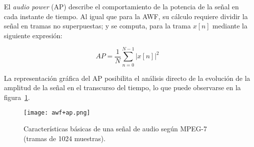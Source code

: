 El \textit{audio power} (AP) describe el comportamiento de la potencia de la señal en cada instante de tiempo.
Al igual que para la AWF, su cálculo requiere dividir la señal en tramas no superpuestas;
y se computa, para la trama $x[n]$ mediante la siguiente expresión:

\begin{equation}
    \label{eq:AP}
    AP = \frac{1}{N}\sum_{n=0}^{N-1}{|x[n]|^2}
\end{equation}

La representación gráfica del AP posibilita el análisis directo de la evolución de la amplitud de la señal en el transcurso del tiempo, lo que puede observarse en la figura~\ref{img:awf+ap}.

\begin{figure}[!h]
    \centering
    \texttt{[image: awf+ap.png]}
    \caption{Características básicas de una señal de audio según MPEG-7 (tramas de 1024 muestras).}
    \label{img:awf+ap}
\end{figure}

